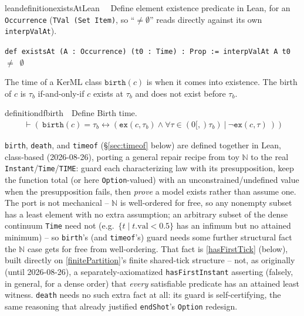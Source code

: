 \begin{restatable}{leandefinition}{existsAtLean}~~ Define element existence predicate in
Lean, for an \texttt{Occurrence} (\texttt{TVal (Set Item)}, so ``$\ne\emptyset$'' reads directly against its
own \texttt{interpValAt}).

\texttt{\textcolor{leancolor}{def} \textcolor{leanyellow}{existsAt} (A : Occurrence) (t0 : Time) : Prop := interpValAt A t0 $\ne$ $\emptyset$}
\label{existsAt}
\end{restatable}

\pn The  time of a KerML class $\texttt{birth}(c)$ is when it comes into existence.  The birth of $c$ is $\tau_b$ if-and-only-if $c$ exists at
$\tau_b$ and does not exist before $\tau_b$.

\begin{restatable}{definition}{dfbirth}~~Define Birth time.
\begin{align}
\vdash (~\texttt{birth}(c)=\tau_b \leftrightarrow ( \texttt{ex}(c,\tau_b) \wedge \forall \tau \in (0[,)\tau_b)~\vert~ \lnot \texttt{ex}(c,\tau)~)~)
\label{eq:df-birth}\tag{df-birth}
\end{align}
\end{restatable}

\pn \texttt{birth}, \texttt{death}, and \texttt{timeof} (\S\ref{sec:timeof} below) are defined together in
Lean, class-based (2026-08-26), porting a general repair recipe from toy \texttt{$\mathbb{N}$} to the real
\texttt{Instant}/\texttt{Time}/\texttt{TIME}: guard each characterizing law with its presupposition, keep the
function total (or here \texttt{Option}-valued) with an unconstrained/undefined value when the presupposition
fails, then \emph{prove} a model exists rather than assume one. The port is not mechanical -- \texttt{$\mathbb{N}$}
is well-ordered for free, so any nonempty subset has a least element with no extra assumption; an arbitrary
subset of the dense continuum \texttt{Time} need not (e.g.\ $\{t \mid t.\mathrm{val} < 0.5\}$ has an infimum but
no attained minimum) -- so \texttt{birth}'s (and \texttt{timeof}'s) guard needs some further structural fact
the $\mathbb{N}$ case gets for free from well-ordering. That fact is \ref{hasFirstTick} (below), built directly
on \ref{finitePartition}'s finite shared-tick structure -- not, as originally (until 2026-08-26), a
separately-axiomatized \texttt{hasFirstInstant} asserting (falsely, in general, for a dense order) that
\emph{every} satisfiable predicate has an attained least witness. \texttt{death} needs no such extra fact at
all: its guard is self-certifying, the same reasoning that already justified \texttt{endShot}'s
\texttt{Option} redesign.

